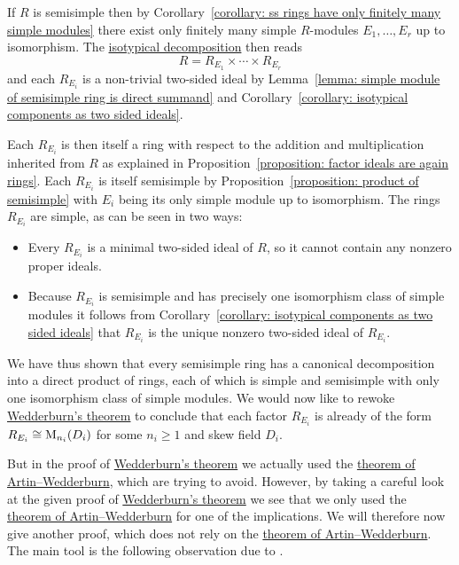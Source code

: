 \begin{fluff}
  \label{fluff: intro to artin wedderburn}
  If $R$ is semisimple then by Corollary~\ref{corollary: ss rings have only finitely many simple modules} there exist only finitely many simple $R$-modules $E_1, \dotsc, E_r$ up to isomorphism.
  The \hyperref[theorem: isotypical decomposition]{isotypical decomposition} then reads
  \[
      R
    = R_{E_1} \times \dotsb \times R_{E_r}
  \]
  and each $R_{E_i}$ is a non-trivial two-sided ideal by Lemma~\ref{lemma: simple module of semisimple ring is direct summand} and Corollary~\ref{corollary: isotypical components as two sided ideals}.
  
  Each $R_{E_i}$ is then itself a ring with respect to the addition and multiplication inherited from $R$ as explained in Proposition~\ref{proposition: factor ideals are again rings}.
  Each $R_{E_i}$ is itself semisimple by Proposition~\ref{proposition: product of semisimple} with $E_i$ being its only simple module up to isomorphism.
  The rings $R_{E_i}$ are simple, as can be seen in two ways:
  \begin{itemize}
    \item
      Every $R_{E_i}$ is a minimal two-sided ideal of $R$, so it cannot contain any nonzero proper ideals.
    \item
      Because $R_{E_i}$ is semisimple and has precisely one isomorphism class of simple modules it follows from Corollary~\ref{corollary: isotypical components as two sided ideals} that $R_{E_i}$ is the unique nonzero two-sided ideal of $R_{E_i}$.
  \end{itemize}
  
  We have thus shown that every semisimple ring has a canonical decomposition into a direct product of rings, each of which is simple and semisimple with only one isomorphism class of simple modules.
  We would now like to rewoke \hyperref[theorem: wedderburns theorem]{Wedderburn’s theorem} to conclude that each factor $R_{E_i}$ is already of the form $R_{E_i} \cong \operatorname{M}_{n_i}(D_i)$ for some $n_i \geq 1$ and skew field $D_i$.
  
  But in the proof of \hyperref[theorem: wedderburns theorem]{Wedderburn’s theorem} we actually used the \hyperref[theorem: artin wedderburn theorem]{theorem of Artin--Wedderburn}, which are trying to avoid.
  However, by taking a careful look at the given proof of \hyperref[theorem: wedderburns theorem]{Wedderburn’s theorem} we see that we only used the \hyperref[theorem: artin wedderburn theorem]{theorem of Artin--Wedderburn} for one of the implications.
  We will therefore now give another proof, which does not rely on the \hyperref[theorem: artin wedderburn theorem]{theorem of Artin--Wedderburn}.
  The main tool is the following observation due to \cite{Rieffel}.
\end{fluff}


